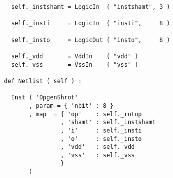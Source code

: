 \begin{itemize}
\begin{verbatim}
    self._instshamt = LogicIn  ( "instshamt", 3 )
    
    self._insti     = LogicIn  ( "insti",     8 )
    
    self._insto     = LogicOut ( "insto",     8 )
    
    self._vdd       = VddIn    ( "vdd" )
    self._vss       = VssIn    ( "vss" )
    
  def Netlist ( self ) :
      
    Inst ( 'DpgenShrot'
         , param = { 'nbit' : 8 }
         , map  = { 'op'    : self._rotop
                  , 'shamt' : self._instshamt
                  , 'i'     : self._insti
                  , 'o'     : self._insto
                  , 'vdd'   : self._vdd
                  , 'vss'   : self._vss
                  }
         )
\end{verbatim}
\end{itemize}
